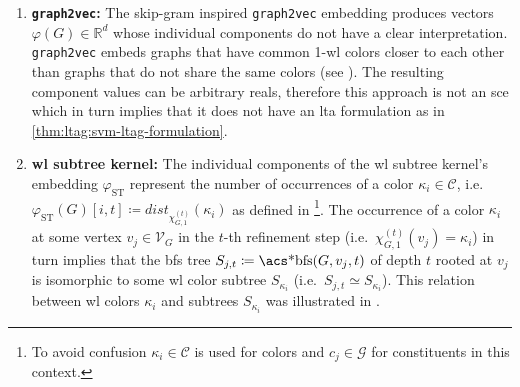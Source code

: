 \begin{enumerate}[label=\textbf{\arabic*.},ref={\arabic*}]
		Under the assumption that the substructure patterns $S_i$ are chosen s.t.\ the their instances $c \in \psi_{\mathrm{FP}, i}(G)$ are nontrivial interpretable constituents, the underlying joint decomposition $\psi_{\mathrm{FP}}(G) \coloneqq \bigcup_{i=1}^d \psi_{\mathrm{FP}, i}(G)$ must also be nontrivial and interpretable.
		Thus, by \cref{thm:ltag:svm-ltag-formulation}, \acp{svm} trained on fingerprint embeddings are \ac{lta} models that produce locally explainable predictions.
	\item \textbf{\texttt{graph2vec}:}
		The skip-gram inspired \texttt{graph2vec} embedding produces vectors $\varphi(G) \in \mathbb{R}^d$ whose individual components do not have a clear interpretation.
		\texttt{graph2vec} embeds graphs that have common 1-\acs{wl} colors closer to each other than graphs that do not share the same colors (see ).
		The resulting component values can be arbitrary reals, therefore this approach is not an \ac{sce} which in turn implies that it does not have an \ac{lta} formulation as in \cref{thm:ltag:svm-ltag-formulation}.
	\item \textbf{\ac{wl} subtree kernel:}\label{itm:ltag:wlst-lta-formulation}
		The individual components of the \ac{wl} subtree kernel's embedding $\varphi_{\mathrm{ST}}$ represent the number of occurrences of a color $\kappa_i \in \mathcal{C}$, i.e.\ $\varphi_{\mathrm{ST}}(G)[i, t] \coloneqq \mathit{dist}_{\chi_{G,1}^{(t)}}(\kappa_i)$ as defined in \footnote{
			To avoid confusion $\kappa_i \in \mathcal{C}$ is used for colors and $c_j \in \mathcal{G}$ for constituents in this context.
		}.
		The occurrence of a color $\kappa_i$ at some vertex $v_j \in \mathcal{V}_G$ in the $t$-th refinement step (i.e.\ $\chi_{G,1}^{(t)}(v_j) = \kappa_i$) in turn implies that the \ac{bfs} tree $S_{j,t} \coloneqq \text{\acs*{bfs}}(G, v_j, t)$ of depth $t$ rooted at $v_j$ is isomorphic to some \ac{wl} color subtree $S_{\kappa_i}$ (i.e.\ $S_{j,t} \simeq S_{\kappa_i}$).
		This relation between \ac{wl} colors $\kappa_i$ and subtrees $S_{\kappa_i}$ was illustrated in .


\end{enumerate}
